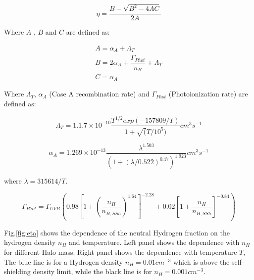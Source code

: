 \documentclass[12pt]{article}
\begin{document}
\begin{equation}\label{eq:eta}
\eta = \dfrac{B - \sqrt{B^2 - 4AC}}{2A}
\end{equation}

Where $A$ , $B$ and $C$ are defined as:

\begin{equation}
\begin{split}
A = \alpha_A + \Lambda_T \\
B = 2\alpha_A + \dfrac{\Gamma_{Phot}}{n_H} + \Lambda_T \\
C = \alpha_A
\end{split}
\end{equation}

Where $\Lambda_T$, $\alpha_A$ (Case A recombination rate) and
$\Gamma_{Phot}$ (Photoionization rate) are defined as:

\begin{equation}
\Lambda_T = 1.1.7 \times 10 ^{-10} \dfrac{T^{1/2} exp(-157809/T)}{1 + \sqrt(T/10^5)} cm^3 s^{-1}
\end{equation}


\begin{equation}
\alpha_A = 1.269 \times 10 ^{-13} \dfrac{\lambda^{1.503}}{(1 + (\lambda / 0.522)^{0.47} )^{1.923}} cm^{3} s^{-1}
\end{equation}

where $\lambda = 315614 / T$.

\begin{equation}
\Gamma_{Phot} = \Gamma_{UVB} \left(  0.98\left[ 1 + \left( \dfrac{n_H}{n_{H, SSh}} \right)^{1.64}  \right]^{-2.28} + 0.02 \left[ 1 + \dfrac{n_H}{n_{H,SSh}} \right]^{-0.84}   \right)
\end{equation}

Fig.\ref{fig:eta} shows the dependence of the neutral Hydrogen
fraction on the hydrogen density $n_H$ and temperature. Left panel
shows the dependence with $n_H$ for different Halo mass. Right panel
shows the dependence with temperature $T$, The blue
line is for a Hydrogen density $n_H = 0.01 cm^{-3}$
which is above the self-shielding density limit, while the black line is for $n_H  = 0.001 cm^{-3}$.
\end{document}
